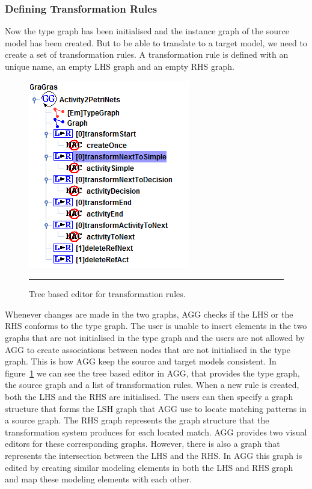 \subsubsection*{Defining Transformation Rules}
\label{sec:AGG_rules}
Now the type graph has been initialised and the instance graph of the
source model has been created. But to be able to translate to a target model,
we need to create a set of transformation rules. A transformation rule is
defined with an unique name, an empty LHS graph and an empty RHS graph. 

\begin{figure}[H]
	\centering
	\includegraphics[scale=0.7]{figures/AGGTreeBasedEditor.png}
	\rule{35em}{0.5pt}
	\caption[Tree based editor in AGG]
	{Tree based editor for transformation rules.}
	\label{fig:AGGTreeBasedEditor}
\end{figure}

Whenever changes are made in the two graphs, AGG checks if the LHS or the RHS
conforms to the type graph. The user is unable to insert elements in the two
graphs that are not initialised in the type graph and the users are not allowed
by AGG to create associations between nodes that are not initialised in the type
graph. This is how AGG keep the source and target models consistent. In
figure~\ref{fig:AGGTreeBasedEditor} we can see the tree based editor in AGG,
that provides the type graph, the source graph and a list of transformation
rules. When a new rule is created, both the LHS and the RHS are initialised. The
users can then specify a graph structure that forms the LSH graph that AGG use
to locate matching patterns in a source graph. The RHS graph represents the
graph structure that the transformation system produces for each located match.
AGG provides two visual editors for these corresponding graphs. However, there
is also a graph that represents the intersection between the LHS and the RHS. In
AGG this graph is edited by creating similar modeling elements in both the LHS
and RHS graph and map these modeling elements with each other. 


